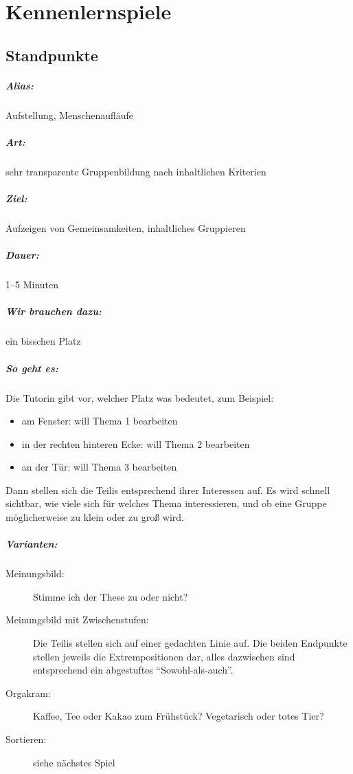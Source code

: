\chapter{Kennenlernspiele}

\section{Standpunkte}
\label{standpunkte}

\paragraph{Alias:} Aufstellung, Menschenaufläufe
\paragraph{Art:} sehr transparente Gruppenbildung nach inhaltlichen Kriterien
\paragraph{Ziel:} Aufzeigen von Gemeinsamkeiten, inhaltliches Gruppieren
\paragraph{Dauer:} 1--5 Minuten
\paragraph{Wir brauchen dazu:} ein bisschen Platz
\paragraph{So geht es:} Die Tutorin gibt vor, welcher Platz was bedeutet, zum Beispiel:
	\begin{itemize}
		\item am Fenster: will Thema 1 bearbeiten
		\item in der rechten hinteren Ecke: will Thema 2 bearbeiten
		\item an der Tür: will Thema 3 bearbeiten
	\end{itemize}
	Dann stellen sich die Teilis entsprechend ihrer Interessen auf. Es wird schnell sichtbar, wie viele sich für welches Thema interessieren, und ob eine Gruppe möglicherweise zu klein oder zu groß wird.
\paragraph{Varianten:}
	\begin{description}
		\item[Meinungsbild:] Stimme ich der These zu oder nicht?
		\item[Meinungsbild mit Zwischenstufen:] Die Teilis stellen sich auf einer gedachten Linie auf. Die beiden Endpunkte stellen jeweils die Extrempositionen dar, alles dazwischen sind entsprechend ein abgestuftes "`Sowohl-als-auch"'.
		\item [Orgakram:] Kaffee, Tee oder Kakao zum Frühstück? Vegetarisch oder totes Tier?
		\item[Sortieren:] siehe nächstes Spiel
	\end{description}
